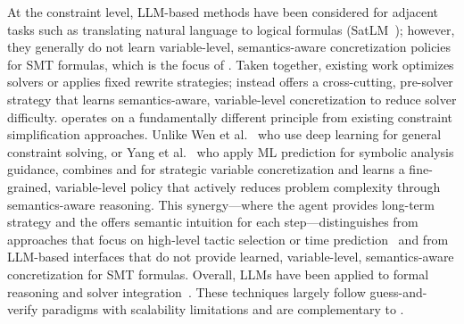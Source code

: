 At the constraint level, LLM-based methods have been considered for adjacent tasks such as translating natural language to logical formulas (SatLM~\cite{ye2023satlm}); however, they generally do not learn variable-level, semantics-aware concretization policies for SMT formulas, which is the focus of \tool.
 Taken together, existing work optimizes solvers or applies fixed rewrite strategies; \tool instead offers a cross-cutting, pre-solver strategy that learns semantics-aware, variable-level concretization to reduce solver difficulty.%
\tool operates on a fundamentally different principle from existing constraint simplification approaches. Unlike Wen et al.~\cite{wenConstraintSolvingDeep2020} who use deep learning for general constraint solving, or Yang et al.~\cite{yangExploringStrategiesGuiding2024} who apply ML prediction for symbolic analysis guidance, \tool combines \RL{} and \LLM{} for strategic variable concretization and learns a fine-grained, variable-level policy that actively reduces problem complexity through semantics-aware reasoning. This synergy---where the \RL{} agent provides long-term strategy and the \LLM{} offers semantic intuition for each step---distinguishes \tool from approaches that focus on high-level tactic selection or time prediction~\cite{chakraborty2023ranking, DBLP:conf/icml/LuoCHSZL23, luoBoostingSymbolicExecutionTime2021} and from LLM-based interfaces that do not provide learned, variable-level, semantics-aware concretization for SMT formulas. Overall, LLMs have been applied to formal reasoning and solver integration~\cite{kamath2023finding, chakraborty2023ranking, ye2023satlm, pan2023logiclm, szeider2025mcp}. These techniques largely follow guess-and-verify paradigms with scalability limitations and are complementary to \tool.
